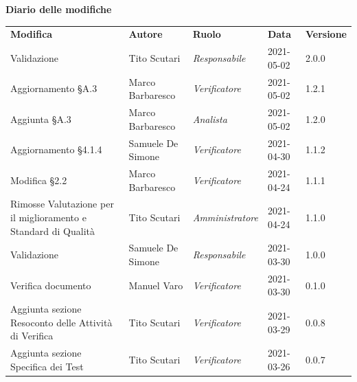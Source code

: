 \documentclass[a4paper]{article}
\begin{document}
\begin{center}
    \textbf{\Large Diario delle modifiche}\\
    \vspace{10px}
    \begin{table}[h!]
        \centering
        \renewcommand{\arraystretch}{1.8}
        \begin{tabular}{p{150px} p{90px} p{70px} p{60px} p{45px}}
            \rowcolor{logo!70} \textbf{Modifica}                           & \textbf{Autore}   & \textbf{Ruolo}          & \textbf{Data} & \textbf{Versione} \\
            Validazione                                                    & Tito Scutari      & \textit{Responsabile}   & 2021-05-02    & 2.0.0             \\
            Aggiornamento \S A.3                                           & Marco Barbaresco  & \textit{Verificatore}   & 2021-05-02    & 1.2.1             \\
            Aggiunta \S A.3                                                & Marco Barbaresco  & \textit{Analista}       & 2021-05-02    & 1.2.0             \\
            Aggiornamento \S 4.1.4                                         & Samuele De Simone & \textit{Verificatore}   & 2021-04-30    & 1.1.2             \\
            Modifica \S 2.2                                                & Marco Barbaresco  & \textit{Verificatore}   & 2021-04-24    & 1.1.1             \\
            Rimosse Valutazione per il miglioramento e Standard di Qualità & Tito Scutari      & \textit{Amministratore} & 2021-04-24    & 1.1.0             \\
            Validazione                                                    & Samuele De Simone & \textit{Responsabile}   & 2021-03-30    & 1.0.0             \\
            Verifica documento                                             & Manuel Varo       & \textit{Verificatore}   & 2021-03-30    & 0.1.0             \\
            Aggiunta sezione Resoconto delle Attività di Verifica          & Tito Scutari      & \textit{Verificatore}   & 2021-03-29    & 0.0.8             \\
            Aggiunta sezione Specifica dei Test                            & Tito Scutari      & \textit{Verificatore}   & 2021-03-26    & 0.0.7             \\

\end{tabular}
\end{table}
\end{center}
\end{document}
